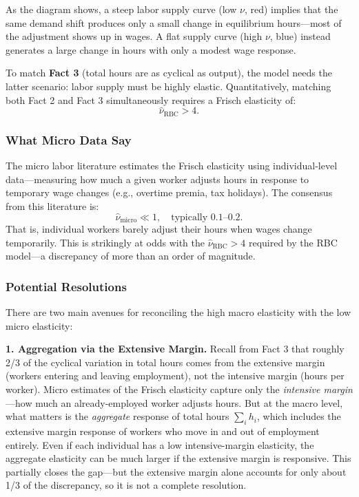 As the diagram shows, a steep labor supply curve (low $\nu$, red) implies that the same demand shift produces only a small change in equilibrium hours---most of the adjustment shows up in wages. A flat supply curve (high $\nu$, blue) instead generates a large change in hours with only a modest wage response. 

To match \textbf{Fact 3} (total hours are as cyclical as output), the model needs the latter scenario: labor supply must be highly elastic. Quantitatively, matching both Fact 2 and Fact 3 simultaneously requires a Frisch elasticity of:
$$
\hat{\nu}_{\text{RBC}} > 4.
$$

\subsubsection*{What Micro Data Say}

The micro labor literature estimates the Frisch elasticity using individual-level data---measuring how much a given worker adjusts hours in response to temporary wage changes (e.g., overtime premia, tax holidays). The consensus from this literature is:
$$
\hat{\nu}_{\text{micro}} \ll 1, \quad \text{typically } 0.1 \text{--} 0.2.
$$
That is, individual workers barely adjust their hours when wages change temporarily. This is strikingly at odds with the $\hat{\nu}_{\text{RBC}} > 4$ required by the RBC model---a discrepancy of more than an order of magnitude.

\subsubsection*{Potential Resolutions}

There are two main avenues for reconciling the high macro elasticity with the low micro elasticity:

\textbf{1. Aggregation via the Extensive Margin.} Recall from Fact 3 that roughly 2/3 of the cyclical variation in total hours comes from the extensive margin (workers entering and leaving employment), not the intensive margin (hours per worker). Micro estimates of the Frisch elasticity capture only the \textit{intensive margin}---how much an already-employed worker adjusts hours. But at the macro level, what matters is the \textit{aggregate} response of total hours $\sum_i h_i$, which includes the extensive margin response of workers who move in and out of employment entirely. Even if each individual has a low intensive-margin elasticity, the aggregate elasticity can be much larger if the extensive margin is responsive. This partially closes the gap---but the extensive margin alone accounts for only about 1/3 of the discrepancy, so it is not a complete resolution.

